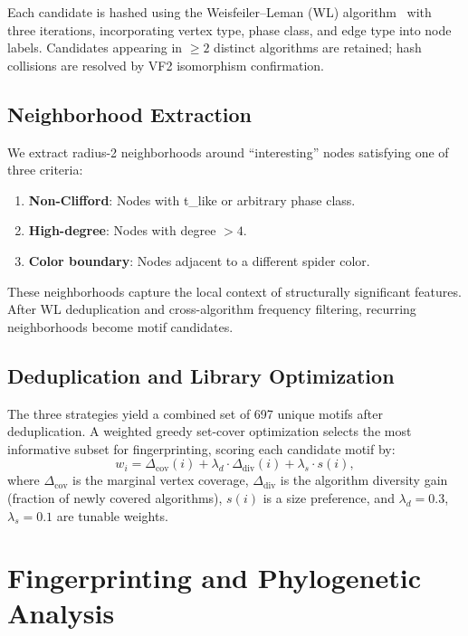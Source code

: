 \documentclass[twocolumn,prl,amsmath,amssymb,superscriptaddress]{revtex4-2}
\begin{document}
Each candidate is hashed using the Weisfeiler--Leman (WL) algorithm~\cite{Weisfeiler1968} with three iterations, incorporating vertex type, phase class, and edge type into node labels.
Candidates appearing in $\geq 2$ distinct algorithms are retained; hash collisions are resolved by VF2 isomorphism confirmation.

\subsection{Neighborhood Extraction}

We extract radius-2 neighborhoods around ``interesting'' nodes satisfying one of three criteria:
\begin{enumerate}
    \item \textbf{Non-Clifford}: Nodes with t\_like or arbitrary phase class.
    \item \textbf{High-degree}: Nodes with degree $> 4$.
    \item \textbf{Color boundary}: Nodes adjacent to a different spider color.
\end{enumerate}

These neighborhoods capture the local context of structurally significant features.
After WL deduplication and cross-algorithm frequency filtering, recurring neighborhoods become motif candidates.

\subsection{Deduplication and Library Optimization}

The three strategies yield a combined set of 697 unique motifs after deduplication.
A weighted greedy set-cover optimization selects the most informative subset for fingerprinting, scoring each candidate motif by:
\begin{equation}
    w_i = \Delta_{\text{cov}}(i) + \lambda_d \cdot \Delta_{\text{div}}(i) + \lambda_s \cdot s(i),
\end{equation}
where $\Delta_{\text{cov}}$ is the marginal vertex coverage, $\Delta_{\text{div}}$ is the algorithm diversity gain (fraction of newly covered algorithms), $s(i)$ is a size preference, and $\lambda_d = 0.3$, $\lambda_s = 0.1$ are tunable weights.

\section{Fingerprinting and Phylogenetic Analysis}
\label{sec:fingerprinting}
\end{document}
